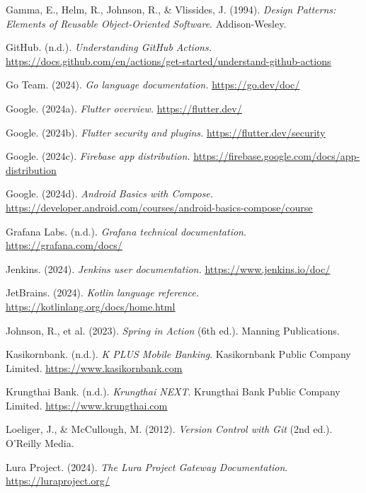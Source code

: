 Gamma, E., Helm, R., Johnson, R., \& Vlissides, J. (1994). \emph{Design
Patterns: Elements of Reusable Object-Oriented Software}.
Addison-Wesley.

GitHub. (n.d.). \emph{Understanding GitHub Actions.}
\href{https://docs.github.com/en/actions/get-started/understand-github-actions}{\ul{https://docs.github.com/en/actions/get-started/understand-github-actions}}

Go Team. (2024). \emph{Go language documentation.}
\href{https://go.dev/doc/}{\ul{https://go.dev/doc/}}

Google. (2024a). \emph{Flutter overview.}
\href{https://flutter.dev/}{\ul{https://flutter.dev/}}

Google. (2024b). \emph{Flutter security and plugins.}
\href{https://flutter.dev/security}{\ul{https://flutter.dev/security}}

Google. (2024c). \emph{Firebase app distribution.}
\href{https://firebase.google.com/docs/app-distribution}{\ul{https://firebase.google.com/docs/app-distribution}}

Google. (2024d). \emph{Android Basics with Compose.}
\href{https://developer.android.com/courses/android-basics-compose/course}{\ul{https://developer.android.com/courses/android-basics-compose/course}}

Grafana Labs. (n.d.). \emph{Grafana technical documentation}.
\href{https://grafana.com/docs/}{\ul{https://grafana.com/docs/}}

Jenkins. (2024). \emph{Jenkins user documentation.}
\href{https://www.jenkins.io/doc/}{\ul{https://www.jenkins.io/doc/}}

JetBrains. (2024). \emph{Kotlin language reference.}
\href{https://kotlinlang.org/docs/home.html}{\ul{https://kotlinlang.org/docs/home.html}}

Johnson, R., et al. (2023). \emph{Spring in Action} (6th ed.). Manning
Publications.

Kasikornbank. (n.d.). \emph{K PLUS Mobile Banking}. Kasikornbank Public
Company Limited.
\href{https://www.kasikornbank.com}{\ul{https://www.kasikornbank.com}}

Krungthai Bank. (n.d.). \emph{Krungthai NEXT}. Krungthai Bank Public
Company Limited.
\href{https://www.krungthai.com}{\ul{https://www.krungthai.com}}

Loeliger, J., \& McCullough, M. (2012). \emph{Version Control with Git}
(2nd ed.). O'Reilly Media.

Lura Project. (2024). \emph{The Lura Project Gateway Documentation}.
\href{https://luraproject.org/}{\ul{https://luraproject.org/}}

